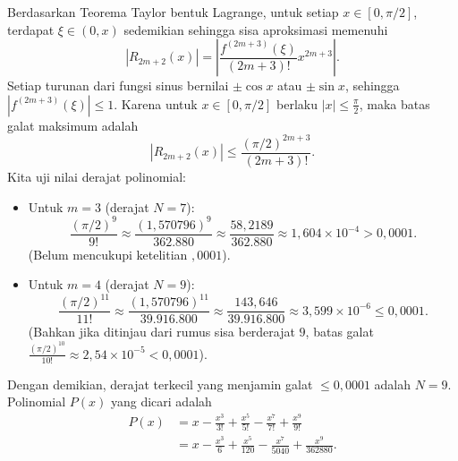 \documentclass[a4paper]{article}
\begin{document}
\begin{enumerate}
\begin{enumerate}[label=(\alph*)]
                Berdasarkan Teorema Taylor bentuk Lagrange, untuk setiap $x \in [0, \pi/2]$, terdapat $\xi \in (0, x)$ sedemikian sehingga sisa aproksimasi memenuhi
                \[
                  |R_{2m+2}(x)| = \left| \frac{f^{(2m+3)}(\xi)}{(2m+3)!} x^{2m+3} \right|.
                \]
                Setiap turunan dari fungsi sinus bernilai $\pm \cos x$ atau $\pm \sin x$, sehingga $|f^{(2m+3)}(\xi)| \le 1$. Karena untuk $x \in [0, \pi/2]$ berlaku $|x| \le \frac{\pi}{2}$, maka batas galat maksimum adalah
                \[
                  |R_{2m+2}(x)| \le \frac{(\pi/2)^{2m+3}}{(2m+3)!}.
                \]
                Kita uji nilai derajat polinomial:
                \begin{itemize}
                  \item Untuk $m = 3$ (derajat $N = 7$):
                        \[
                          \frac{(\pi/2)^9}{9!} \approx \frac{(1{,}570796)^9}{362.880} \approx \frac{58{,}2189}{362.880} \approx 1{,}604 \times 10^{-4} > 0{,}0001.
                        \]
                        (Belum mencukupi ketelitian ${,}0001$).
                  \item Untuk $m = 4$ (derajat $N = 9$):
                        \[
                          \frac{(\pi/2)^{11}}{11!} \approx \frac{(1{,}570796)^{11}}{39.916.800} \approx \frac{143{,}646}{39.916.800} \approx 3{,}599 \times 10^{-6} \le 0{,}0001.
                        \]
                        (Bahkan jika ditinjau dari rumus sisa berderajat $9$, batas galat $\frac{(\pi/2)^{10}}{10!} \approx 2{,}54 \times 10^{-5} < 0{,}0001$).
                \end{itemize}
                Dengan demikian, derajat terkecil yang menjamin galat $\le 0{,}0001$ adalah $N = 9$. Polinomial $P(x)$ yang dicari adalah
                \begin{align*}
                  P(x) & = x - \frac{x^3}{3!} + \frac{x^5}{5!} - \frac{x^7}{7!} + \frac{x^9}{9!}        \\
                       & = x - \frac{x^3}{6} + \frac{x^5}{120} - \frac{x^7}{5040} + \frac{x^9}{362880}.
                \end{align*}


\end{enumerate}
\end{enumerate}
\end{document}
